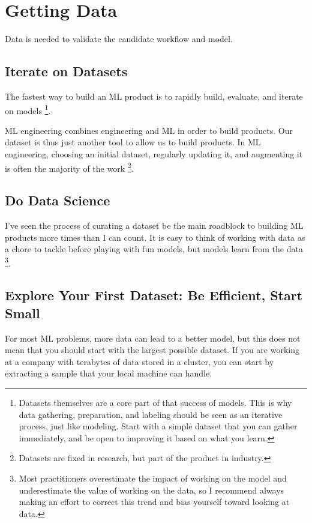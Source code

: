 \section{Getting Data}
Data is needed to validate the candidate workflow and model.



\subsection{Iterate on Datasets}
The fastest way to build an ML product is to rapidly build,
evaluate, and iterate on models
\footnote{
    Datasets themselves are a core part of that success of models.
    This is why data gathering, preparation, and labeling should
    be seen as an iterative process, just like modeling. Start
    with a simple dataset that you can gather immediately, and
    be open to improving it based on what you learn.
}.

ML engineering combines engineering and ML in order to build
products. Our dataset is thus just another tool to allow us
to build products. In ML engineering, choosing an initial dataset,
regularly updating it, and augmenting it is often the majority of
the work
\footnote{
    Datasets are fixed in research, but part of the product in
    industry.
}.


\subsection*{Do Data Science}
I've seen the process of curating a dataset be the main roadblock
to building ML products more times than I can count.
It is easy to think of working with data as a chore to tackle
before playing with fun models, but models learn from the data
\footnote{
    Most practitioners overestimate the impact of working on the
    model and underestimate the value of working on the data, so
    I recommend always making an effort to correct this trend and
    bias yourself toward looking at data.
}.



\subsection{Explore Your First Dataset: Be Efficient, Start Small}
For most ML problems, more data can lead to a better model, but
this does not mean that you should start with the largest possible
dataset. If you are working at a company with terabytes of data
stored in a cluster, you can start by extracting a sample that
your local machine can handle.


